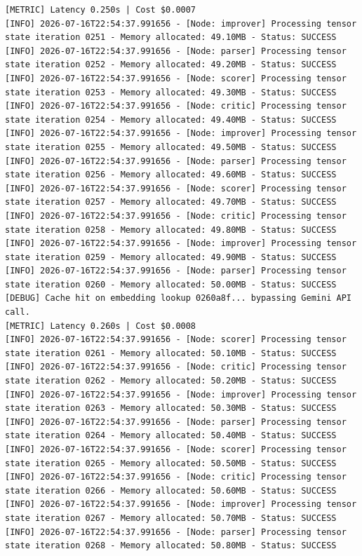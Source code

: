 \documentclass[10pt,journal,compsoc]{IEEEtran}
\begin{document}
\begin{verbatim}
[METRIC] Latency 0.250s | Cost $0.0007
[INFO] 2026-07-16T22:54:37.991656 - [Node: improver] Processing tensor state iteration 0251 - Memory allocated: 49.10MB - Status: SUCCESS
[INFO] 2026-07-16T22:54:37.991656 - [Node: parser] Processing tensor state iteration 0252 - Memory allocated: 49.20MB - Status: SUCCESS
[INFO] 2026-07-16T22:54:37.991656 - [Node: scorer] Processing tensor state iteration 0253 - Memory allocated: 49.30MB - Status: SUCCESS
[INFO] 2026-07-16T22:54:37.991656 - [Node: critic] Processing tensor state iteration 0254 - Memory allocated: 49.40MB - Status: SUCCESS
[INFO] 2026-07-16T22:54:37.991656 - [Node: improver] Processing tensor state iteration 0255 - Memory allocated: 49.50MB - Status: SUCCESS
[INFO] 2026-07-16T22:54:37.991656 - [Node: parser] Processing tensor state iteration 0256 - Memory allocated: 49.60MB - Status: SUCCESS
[INFO] 2026-07-16T22:54:37.991656 - [Node: scorer] Processing tensor state iteration 0257 - Memory allocated: 49.70MB - Status: SUCCESS
[INFO] 2026-07-16T22:54:37.991656 - [Node: critic] Processing tensor state iteration 0258 - Memory allocated: 49.80MB - Status: SUCCESS
[INFO] 2026-07-16T22:54:37.991656 - [Node: improver] Processing tensor state iteration 0259 - Memory allocated: 49.90MB - Status: SUCCESS
[INFO] 2026-07-16T22:54:37.991656 - [Node: parser] Processing tensor state iteration 0260 - Memory allocated: 50.00MB - Status: SUCCESS
[DEBUG] Cache hit on embedding lookup 0260a8f... bypassing Gemini API call.
[METRIC] Latency 0.260s | Cost $0.0008
[INFO] 2026-07-16T22:54:37.991656 - [Node: scorer] Processing tensor state iteration 0261 - Memory allocated: 50.10MB - Status: SUCCESS
[INFO] 2026-07-16T22:54:37.991656 - [Node: critic] Processing tensor state iteration 0262 - Memory allocated: 50.20MB - Status: SUCCESS
[INFO] 2026-07-16T22:54:37.991656 - [Node: improver] Processing tensor state iteration 0263 - Memory allocated: 50.30MB - Status: SUCCESS
[INFO] 2026-07-16T22:54:37.991656 - [Node: parser] Processing tensor state iteration 0264 - Memory allocated: 50.40MB - Status: SUCCESS
[INFO] 2026-07-16T22:54:37.991656 - [Node: scorer] Processing tensor state iteration 0265 - Memory allocated: 50.50MB - Status: SUCCESS
[INFO] 2026-07-16T22:54:37.991656 - [Node: critic] Processing tensor state iteration 0266 - Memory allocated: 50.60MB - Status: SUCCESS
[INFO] 2026-07-16T22:54:37.991656 - [Node: improver] Processing tensor state iteration 0267 - Memory allocated: 50.70MB - Status: SUCCESS
[INFO] 2026-07-16T22:54:37.991656 - [Node: parser] Processing tensor state iteration 0268 - Memory allocated: 50.80MB - Status: SUCCESS

\end{verbatim}
\end{document}
